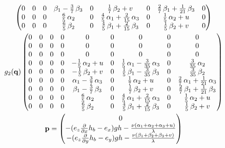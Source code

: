\documentclass{article}
\begin{document}
\begin{gather}
\begin{pmatrix}
          0 & 0 & 0 & \beta_{1} - \frac{3}{7} \, \beta_{3} & 0 & \frac{1}{7} \, \beta_{2} + v & 0 & \frac{2}{7} \, \beta_{1} + \frac{1}{21} \, \beta_{3} & 0 \\
          0 & 0 & 0 & \frac{6}{5} \, \alpha_{2} & 0 & \frac{4}{5} \, \alpha_{1} + \frac{2}{15} \, \alpha_{3} & 0 & \frac{1}{5} \, \alpha_{2} + u & 0 \\
          0 & 0 & 0 & \frac{6}{5} \, \beta_{2} & 0 & \frac{4}{5} \, \beta_{1} + \frac{2}{15} \, \beta_{3} & 0 & \frac{1}{5} \, \beta_{2} + v & 0
        \end{pmatrix} \\
        g_2(\mathbf{q})
        \begin{pmatrix}
          0 & 0 & 0 & 0 & 0 & 0 & 0 & 0 & 0 \\
          0 & 0 & 0 & 0 & 0 & 0 & 0 & 0 & 0 \\
          0 & 0 & 0 & 0 & 0 & 0 & 0 & 0 & 0 \\
          0 & 0 & 0 & 0 & -\frac{1}{5} \, \alpha_{2} + u & 0 & \frac{1}{5} \, \alpha_{1} - \frac{3}{35} \, \alpha_{3} & 0 & \frac{3}{35} \, \alpha_{2} \\
          0 & 0 & 0 & 0 & -\frac{1}{5} \, \beta_{2} + v & 0 & \frac{1}{5} \, \beta_{1} - \frac{3}{35} \, \beta_{3} & 0 & \frac{3}{35} \, \beta_{2} \\
          0 & 0 & 0 & 0 & \alpha_{1} - \frac{3}{7} \, \alpha_{3} & 0 & \frac{1}{7} \, \alpha_{2} + u & 0 & \frac{2}{7} \, \alpha_{1} + \frac{1}{21} \, \alpha_{3} \\
          0 & 0 & 0 & 0 & \beta_{1} - \frac{3}{7} \, \beta_{3} & 0 & \frac{1}{7} \, \beta_{2} + v & 0 & \frac{2}{7} \, \beta_{1} + \frac{1}{21} \, \beta_{3} \\
          0 & 0 & 0 & 0 & \frac{6}{5} \, \alpha_{2} & 0 & \frac{4}{5} \, \alpha_{1} + \frac{2}{15} \, \alpha_{3} & 0 & \frac{1}{5} \, \alpha_{2} + u \\
          0 & 0 & 0 & 0 & \frac{6}{5} \, \beta_{2} & 0 & \frac{4}{5} \, \beta_{1} + \frac{2}{15} \, \beta_{3} & 0 & \frac{1}{5} \, \beta_{2} + v
        \end{pmatrix} \\
        \mathbf{p} =
        \begin{pmatrix}
          0 \\
          -{(e_{z} \frac{\partial}{\partial x}h_{b} - e_{x})} g h - \frac{\nu {(\alpha_{1} + \alpha_{2} + \alpha_{3} + u)}}{\lambda} \\
          -{(e_{z} \frac{\partial}{\partial y}h_{b} - e_{y})} g h - \frac{\nu {(\beta_{1} + \beta_{2} + \beta_{3} + v)}}{\lambda} \\

\end{pmatrix}
\end{gather}
\end{document}

